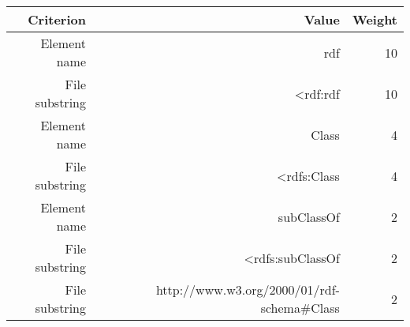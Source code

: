 \begin{tabular}{|r|r|r|}
\hline
\bf Criterion&\bf Value&\bf Weight\\
\hline
Element name&rdf&10\\
\hline
File substring&<rdf:rdf&10\\
\hline
Element name&Class&4\\
\hline
File substring&<rdfs:Class&4\\
\hline
Element name&subClassOf&2\\
\hline
File substring&<rdfs:subClassOf&2\\
\hline
File substring&http://www.w3.org/2000/01/rdf-schema\#Class&2\\
\hline
\end{tabular}

